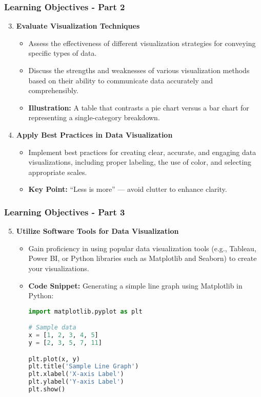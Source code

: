 \documentclass{beamer}
\begin{document}
\begin{frame}[fragile]
    \frametitle{Learning Objectives - Part 2}
    \begin{enumerate}
        \setcounter{enumi}{2} %
        \item \textbf{Evaluate Visualization Techniques}  
            \begin{itemize}
                \item Assess the effectiveness of different visualization strategies for conveying specific types of data.
                \item Discuss the strengths and weaknesses of various visualization methods based on their ability to communicate data accurately and comprehensibly.
                \item \textbf{Illustration:} A table that contrasts a pie chart versus a bar chart for representing a single-category breakdown.
            \end{itemize}

        \item \textbf{Apply Best Practices in Data Visualization}  
            \begin{itemize}
                \item Implement best practices for creating clear, accurate, and engaging data visualizations, including proper labeling, the use of color, and selecting appropriate scales.
                \item \textbf{Key Point:} “Less is more” — avoid clutter to enhance clarity.
            \end{itemize}
    \end{enumerate}
\end{frame}

\begin{frame}[fragile]
    \frametitle{Learning Objectives - Part 3}
    \begin{enumerate}
        \setcounter{enumi}{4} %
        \item \textbf{Utilize Software Tools for Data Visualization}  
            \begin{itemize}
                \item Gain proficiency in using popular data visualization tools (e.g., Tableau, Power BI, or Python libraries such as Matplotlib and Seaborn) to create your visualizations.
                \item \textbf{Code Snippet:} Generating a simple line graph using Matplotlib in Python:
                \begin{lstlisting}[language=Python]
import matplotlib.pyplot as plt

# Sample data
x = [1, 2, 3, 4, 5]
y = [2, 3, 5, 7, 11]

plt.plot(x, y)
plt.title('Sample Line Graph')
plt.xlabel('X-axis Label')
plt.ylabel('Y-axis Label')
plt.show()
                \end{lstlisting}
            \end{itemize}
    \end{enumerate}
\end{frame}
\end{document}
